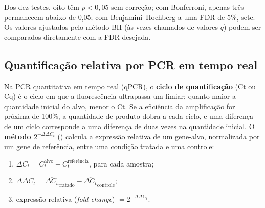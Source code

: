 \documentclass[
]{book}
\providecommand{\tightlist}{%
  \setlength{\itemsep}{0pt}\setlength{\parskip}{0pt}}
\begin{document}
Dos dez testes, oito têm \(p < 0{,}05\) sem correção; com Bonferroni, apenas três permanecem abaixo de 0,05; com Benjamini--Hochberg a uma FDR de 5\%, sete. Os valores ajustados pelo método BH (às vezes chamados de valores \(q\)) podem ser comparados diretamente com a FDR desejada.

\subsection{Quantificação relativa por PCR em tempo real}\label{quantificauxe7uxe3o-relativa-por-pcr-em-tempo-real}

Na PCR quantitativa em tempo real (qPCR), o \textbf{ciclo de quantificação} (Ct ou Cq) é o ciclo em que a fluorescência ultrapassa um limiar; quanto maior a quantidade inicial do alvo, menor o Ct. Se a eficiência da amplificação for próxima de 100\%, a quantidade de produto dobra a cada ciclo, e uma diferença de um ciclo corresponde a uma diferença de duas vezes na quantidade inicial. O \textbf{método \(2^{-\Delta\Delta C_t}\)} () calcula a expressão relativa de um gene-alvo, normalizada por um gene de referência, entre uma condição tratada e uma controle:

\begin{enumerate}
\def\labelenumi{\arabic{enumi}.}
\tightlist
\item
  \(\Delta C_t = C_t^{\text{alvo}} - C_t^{\text{referência}}\), para cada amostra;
\item
  \(\Delta\Delta C_t = \overline{\Delta C_t}_{\text{tratado}} - \overline{\Delta C_t}_{\text{controle}}\);
\item
  expressão relativa (\emph{fold change}) \(= 2^{-\Delta\Delta C_t}\).
\end{enumerate}
\end{document}
